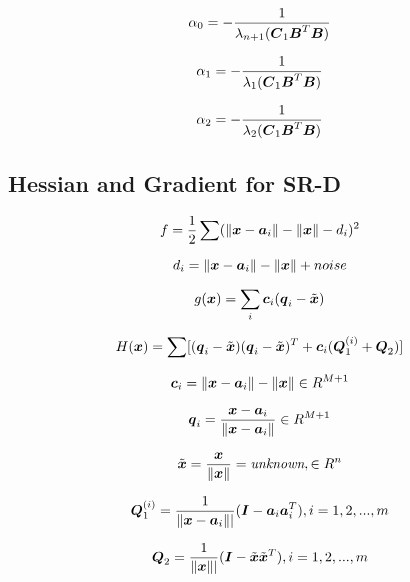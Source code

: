 \begin{equation}
\alpha_0 = -\frac{1}{\lambda_{n+1}(\BC_1\BB^T\BB)}
\end{equation}

\begin{equation}
\alpha_1 = -\frac{1}{\lambda_1(\BC_1\BB^T\BB)}
\end{equation}

\begin{equation}
\alpha_2 = -\frac{1}{\lambda_2(\BC_1\BB^T\BB)}
\end{equation}

\subsection{Hessian and Gradient for SR-D}

\begin{equation}
f = \frac{1}{2} \sum (\|\Bx - \Ba_i\| - \|\Bx\| - d_i)^2
\end{equation}

\begin{equation}
d_i = \|\Bx - \Ba_i\| - \|\Bx\| + noise
\end{equation}

\begin{equation}
g(\Bx) = \sum_i \Bc_i (\Bq_i - \tilde{\Bx})
\end{equation}

\begin{equation}
H(\Bx) = \sum [(\Bq_i - \tilde{\Bx})(\Bq_i - \tilde{\Bx})^T + \Bc_i(\BQ_1^{(i)} + \BQ_2)]
\end{equation}

\begin{equation}
\Bc_i = \|\Bx - \Ba_i\| - \|\Bx\| \in R^{M+1}
\end{equation}

\begin{equation}
\Bq_i = \frac{\Bx - \Ba_i}{\|\Bx - \Ba_i\|} \in R^{M+1}
\end{equation}

\begin{equation}
\tilde{\Bx} = \frac{\Bx}{\|\Bx\|} = \textit{unknown}, \in R^n
\end{equation}

\begin{equation}
\BQ_1^{(i)} = \frac{1}{\|\Bx - \Ba_i\||}(\BI - \Ba_i\Ba_i^T), i = 1, 2,...,m
\end{equation}

\begin{equation}
\BQ_2 = \frac{1}{\|\Bx\||}(\BI - \tilde{\Bx}\tilde{\Bx}^T), i = 1, 2,...,m
\end{equation}

